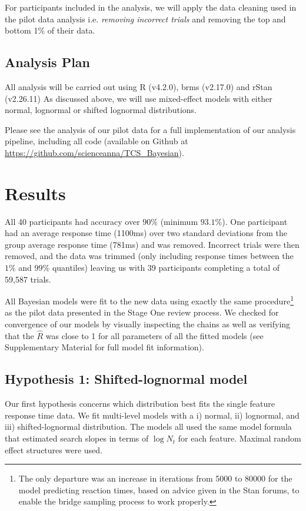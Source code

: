 \documentclass[preprint,12pt,authoryear]{elsarticle}
\begin{document}
For participants included in the analysis, we will apply the data cleaning used in the pilot data analysis i.e. \textit{removing incorrect trials} and removing the top and bottom 1\% of their data.

\subsection{Analysis Plan}

All analysis will be carried out using R (v4.2.0), brms (v2.17.0) and rStan (v2.26.11) As discussed above, we will use mixed-effect models with either normal, lognormal or shifted lognormal distributions. 

Please see the analysis of our pilot data for a full implementation of our analysis pipeline, including all code (available on Github at  
\url{https://github.com/scienceanna/TCS_Bayesian}).


\section{Results}

All 40 participants had accuracy over $90\%$ (minimum $93.1\%$). One participant had an average response time (1100ms) over two standard deviations from the group average response time (781ms) and was removed. Incorrect trials were then removed, and the data was trimmed (only including response times between the $1\%$ and $99\%$ quantiles) leaving us with 39 participants completing a total of 59,587 trials.

All Bayesian models were fit to the new data using exactly the same procedure\footnote{The only departure was an increase in iterations from 5000 to 80000 for the model predicting reaction times, based on advice given in the Stan forums, to enable the bridge sampling process to work properly.} as the pilot data presented in the Stage One review process. We checked for convergence  of our models by visually inspecting the chains as well as verifying that the $\hat{R}$ was close to 1 for all parameters of all the fitted models (see Supplementary Material for full model fit information).

\subsection{Hypothesis 1: Shifted-lognormal model}

Our first hypothesis concerns which distribution best fits the single feature response time data. We fit multi-level models with
a i) normal, ii) lognormal, and iii) shifted-lognormal distribution. The models all used the same model formula that estimated search slopes in terms of $\log{N_t}$ for each feature. Maximal random effect structures were used. 
\end{document}

